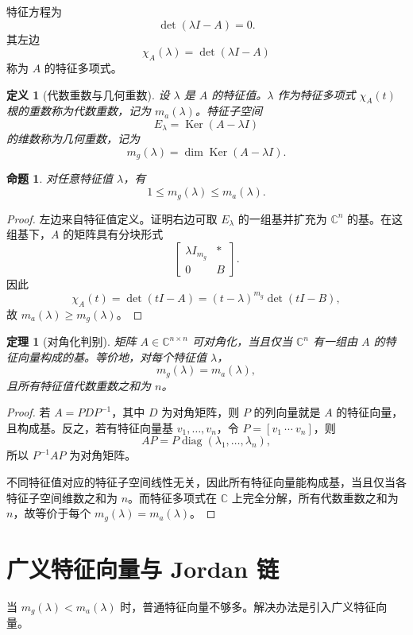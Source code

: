 \documentclass[UTF8,openany,zihao=-4]{ctexbook}
\theoremstyle{cnplain}
\newtheorem{definition}{定义}[chapter]
\newtheorem{theorem}{定理}[chapter]
\newtheorem{proposition}{命题}[chapter]
\newcommand{\C}{\mathbb C}
\newcommand{\Ker}{\operatorname{Ker}}
\newcommand{\diag}{\operatorname{diag}}
\begin{document}
特征方程为
\[
\det(\lambda I-A)=0.
\]
其左边
\[
\chi_A(\lambda)=\det(\lambda I-A)
\]
称为 $A$ 的特征多项式。

\begin{definition}[代数重数与几何重数]
设 $\lambda$ 是 $A$ 的特征值。$\lambda$ 作为特征多项式 $\chi_A(t)$ 根的重数称为代数重数，记为 $m_a(\lambda)$。特征子空间
\[
E_\lambda=\Ker(A-\lambda I)
\]
的维数称为几何重数，记为
\[
m_g(\lambda)=\dim\Ker(A-\lambda I).
\]
\end{definition}

\begin{proposition}
对任意特征值 $\lambda$，有
\[
1\le m_g(\lambda)\le m_a(\lambda).
\]
\end{proposition}

\begin{proof}
左边来自特征值定义。证明右边可取 $E_\lambda$ 的一组基并扩充为 $\C^n$ 的基。在这组基下，$A$ 的矩阵具有分块形式
\[
\begin{bmatrix}
\lambda I_{m_g}& *\\
0&B
\end{bmatrix}.
\]
因此
\[
\chi_A(t)=\det(tI-A)=(t-\lambda)^{m_g}\det(tI-B),
\]
故 $m_a(\lambda)\ge m_g(\lambda)$。
\end{proof}

\begin{theorem}[对角化判别]
矩阵 $A\in\C^{n\times n}$ 可对角化，当且仅当 $\C^n$ 有一组由 $A$ 的特征向量构成的基。等价地，对每个特征值 $\lambda$，
\[
m_g(\lambda)=m_a(\lambda),
\]
且所有特征值代数重数之和为 $n$。
\end{theorem}

\begin{proof}
若 $A=PDP^{-1}$，其中 $D$ 为对角矩阵，则 $P$ 的列向量就是 $A$ 的特征向量，且构成基。反之，若有特征向量基 $v_1,
\ldots,v_n$，令 $P=[v_1\ \cdots\ v_n]$，则
\[
AP=P\diag(\lambda_1,
\ldots,\lambda_n),
\]
所以 $P^{-1}AP$ 为对角矩阵。

不同特征值对应的特征子空间线性无关，因此所有特征向量能构成基，当且仅当各特征子空间维数之和为 $n$。而特征多项式在 $\C$ 上完全分解，所有代数重数之和为 $n$，故等价于每个 $m_g(\lambda)=m_a(\lambda)$。
\end{proof}

\section{广义特征向量与 Jordan 链}

当 $m_g(\lambda)<m_a(\lambda)$ 时，普通特征向量不够多。解决办法是引入广义特征向量。
\end{document}
